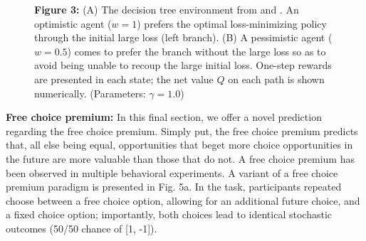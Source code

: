 \documentclass[11pt]{article} %
\begin{document}
\begin{figure}[!b]
  \centerline{%
  }
  \par \textbf{Figure 3:} (A) The decision tree environment from \cite{Huys2012} and \cite{Lally2017}. An optimistic agent ($w=1$) prefers the optimal loss-minimizing policy through the initial large loss (left branch). (B) A pessimistic agent ($w=0.5$) comes to prefer the branch without the large loss so as to avoid being unable to recoup the large initial loss. One-step rewards are presented in each state; the net value $Q$ on each path is shown numerically. (Parameters: $\gamma = 1.0$)
\end{figure}

\textbf{Free choice premium:} In this final section, we offer a novel prediction regarding the free choice premium. Simply put, the free choice premium predicts that, all else being equal, opportunities that beget more choice opportunities in the future are more valuable than those that do not. A free choice premium has been observed in multiple behavioral experiments. \cite{Suzuki1997, Leotti2011, Leotti2014, Cockburn2014} A variant of a free choice premium paradigm is presented in Fig. 5a. In the task, participants repeated choose between a free choice option, allowing for an additional future choice, and a fixed choice option; importantly, both choices lead to identical stochastic outcomes (50/50 chance of [1, -1]).  
\end{document}
